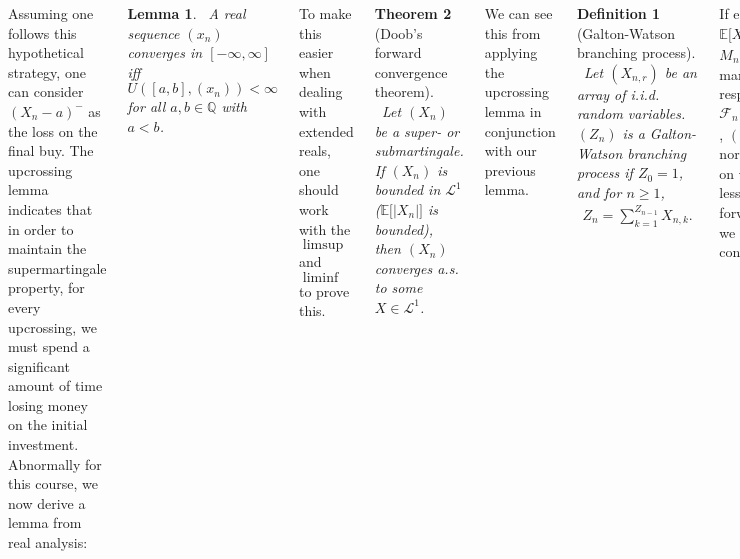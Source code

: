 \documentclass{tikzposter} %
\newtheorem{theorem}{Theorem}
\newtheorem{lemma}[theorem]{Lemma}
\newtheorem{definition}{Definition}
\begin{document}
\begin{columns}
{    Assuming one follows this hypothetical strategy, one can consider $(X_{n}-a)^{-}$ as the loss on the final buy. The upcrossing lemma indicates that in order to maintain the supermartingale property, for every upcrossing, we must spend a significant amount of time losing money on the initial investment. \\

    Abnormally for this course, we now derive a lemma from real analysis:
    \begin{lemma}
    \ A real sequence $(x_{n})$ converges in $[-\infty,\infty]$ iff $U([a,b],(x_{n})) < \infty$ for all $a,b \in \mathbb{Q}$ with $a < b$.
    \end{lemma}
    \hphantom{}

    To make this easier when dealing with extended reals, one should work with the $\limsup$ and $\liminf$ to prove this. \\

    \begin{theorem}[Doob's forward convergence theorem]
    \ Let $(X_{n})$ be a super- or submartingale. If $(X_{n})$ is bounded in $\mathcal{L}^{1}$ ($\mathbb{E}\big[|X_{n}|\big]$ is bounded), then $(X_{n})$ converges a.s. to some $X \in \mathcal{L}^{1}$.
    \end{theorem}
    \hphantom{}

    We can see this from applying the upcrossing lemma in conjunction with our previous lemma. \\

    \begin{definition}[Galton-Watson branching process]
    \ Let $(X_{n,r})$ be an array of i.i.d. random variables. $(Z_{n})$ is a Galton-Watson branching process if $Z_{0} = 1$, and for $n \ge 1$,
    \begin{align*}
      Z_{n} = \sum_{k=1}^{Z_{n-1}} X_{n,k}.
    \end{align*}
    \end{definition}
    \hphantom{}

    If each $X_{n,r}$ is integrable, and $\mathbb{E}\big[X_{0,0}\big] = \mu \neq 0$, we can write $M_{n} = Z_{n}/\mu^{n}$ to get a martingale $(M_{n})$ with respect to $\mathcal{F}_{n} = \sigma(\{X_{k,r} : r \ge 1,\, k \le n\})$, $(Z_{n})$ a sub-, super-, or normal martingale depending on whether $\mu$ is greater than, less than, or equal to $1$. By the forward-convergence theorem, we see that $(Z_{n})$ can either converge or blow up. \\

}
\end{columns}
\end{document}
